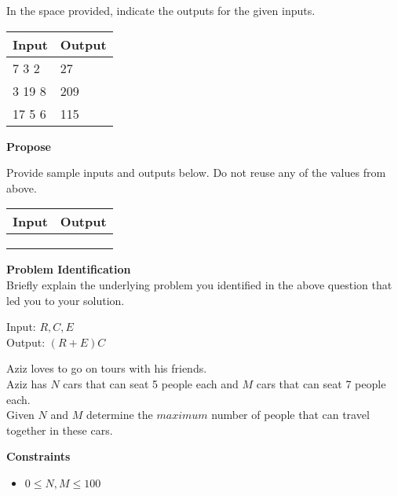 \documentclass[a4paper]{exam}
\newcommand\heading[1]{\textbf{#1}}
\begin{document}
\begin{questions}
    In the space provided, indicate the outputs for the given inputs.

    \begin{tabularx}{\textwidth}{|X|X|}
        \rowcolor{gray!50}
        \hline
        Input  & Output \\ \hline\hline
        7 3 2  & 27     \\\hline
        3 19 8 & 209    \\\hline
        17 5 6 & 115    \\\hline
    \end{tabularx}

    \heading{Propose}

    Provide sample inputs and outputs below. Do not reuse any of the values from above.

    \begin{tabularx}{\textwidth}{|X|X|}
        \rowcolor{gray!50}
        \hline
        Input & Output \\ \hline\hline
              &        \\\hline
              &        \\\hline
              &        \\\hline
    \end{tabularx}


    \heading{Problem Identification}\\
    Briefly explain the underlying problem you identified in the above question that led you to your solution.

    \begin{mdframed}
      Input: $R,C,E$\\
      Output: $(R+E)C$
    \end{mdframed}


    Aziz loves to go on tours with his friends.
    \\
    Aziz has $N$ cars that can seat 5 people each and $M$ cars that can seat 7 people each.
    \\

    Given $N$ and $M$ determine the $maximum$ number of people that can travel together in these cars.

    \heading{Constraints}
    \begin{itemize}
        \item $0 \le N,M \le 100$
    \end{itemize}



\end{questions}
\end{document}
